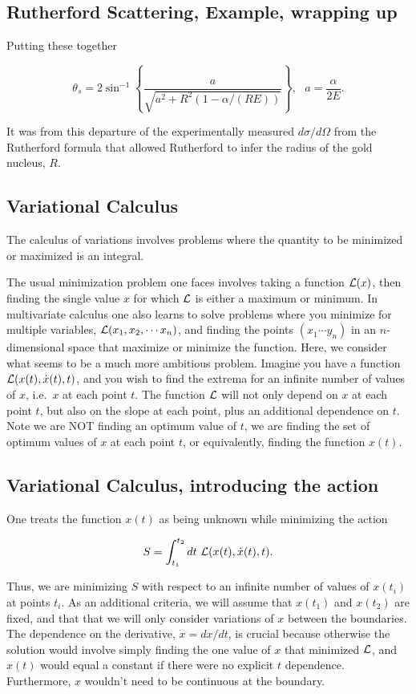 \documentclass[%
oneside,                 %
final,                   %
10pt]{article}
\begin{document}
\subsection{Rutherford Scattering, Example, wrapping up}

Putting these together

\[
\theta_s=2\sin^{-1}\left\{
\frac{a}{\sqrt{a^2+R^2(1-\alpha/(RE))}}
\right\},~~~a=\frac{\alpha}{2E}.
\]

It was from this departure of the experimentally measured
$d\sigma/d\Omega$ from the Rutherford formula that allowed Rutherford
to infer the radius of the gold nucleus, $R$.

\subsection{Variational Calculus}

The calculus of variations involves 
problems where the quantity to be minimized or maximized is an integral. 

The usual minimization problem one faces involves taking a function
${\cal L}(x)$, then finding the single value $x$ for which ${\cal L}$
is either a maximum or minimum. In multivariate calculus one also
learns to solve problems where you minimize for multiple variables,
${\cal L}(x_1,x_2,\cdots x_n)$, and finding the points $(x_1\cdots
y_n)$ in an $n$-dimensional space that maximize or minimize the
function. Here, we consider what seems to be a much more ambitious
problem. Imagine you have a function ${\cal L}(x(t),\dot{x}(t),t)$,
and you wish to find the extrema for an infinite number of values of
$x$, i.e.~$x$ at each point $t$. The function ${\cal L}$ will not only
depend on $x$ at each point $t$, but also on the slope at each point,
plus an additional dependence on $t$. Note we are NOT finding an
optimum value of $t$, we are finding the set of optimum values of $x$
at each point $t$, or equivalently, finding the function $x(t)$.

\subsection{Variational Calculus, introducing the action}

One treats the function $x(t)$ as being unknown while minimizing the action

\[
S=\int_{t_1}^{t_2}dt~{\cal L}(x(t),\dot{x}(t),t).
\]

Thus, we are minimizing $S$ with respect to an infinite number of
values of $x(t_i)$ at points $t_i$. As an additional criteria, we will
assume that $x(t_1)$ and $x(t_2)$ are fixed, and that that we will
only consider variations of $x$ between the boundaries. The dependence
on the derivative, $\dot{x}=dx/dt$, is crucial because otherwise the
solution would involve simply finding the one value of $x$ that
minimized ${\cal L}$, and $x(t)$ would equal a constant if there were no
explicit $t$ dependence. Furthermore, $x$ wouldn't need to be
continuous at the boundary.
\end{document}
